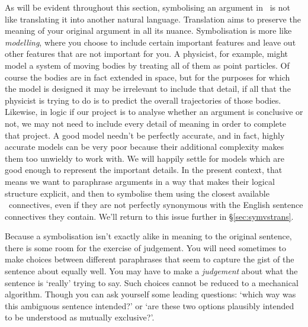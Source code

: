 As will be evident throughout this section, symbolising an argument in \TFL\ is not like translating it into another natural language. Translation aims to preserve the meaning of your original argument in all its nuance. Symbolisation is more like \emph{modelling}, where you choose to include certain important features and leave out other features that are not important for you. A physicist, for example, might model a system of moving bodies by treating all of them as point particles. Of course the bodies are in fact extended in space, but for the purposes for which the model is designed it may be irrelevant to include that detail, if all that the physicist is trying to do is to predict the overall trajectories of those bodies. Likewise, in logic if our project is to analyse whether an argument is conclusive or not, we may not need to include every detail of meaning in order to complete that project. A good model needn't be perfectly accurate, and in fact, highly accurate models can be very poor because their additional complexity makes them too unwieldy to work with. We will happily settle for models which are good enough to represent the important details. In the present context, that means we want to paraphrase arguments in a way that makes their logical structure explicit, and then to symbolise them using the closest available \TFL\ connectives, even if they are not perfectly synonymous with the English sentence connectives they contain. We'll return to this issue further in §\ref{sec:symvstrans}.

Because a symbolisation isn't exactly alike in meaning to the original sentence, there is some room for the exercise of judgement. You will need sometimes to make choices between different paraphrases that seem to capture the gist of the sentence about equally well. You may have to make a \emph{judgement} about what the sentence is `really' trying to say. Such choices cannot be reduced to a mechanical algorithm. Though you can ask yourself some leading questions: ‘which way was this ambiguous sentence intended?’ or ‘are these two options plausibly intended to be understood as mutually exclusive?’.


